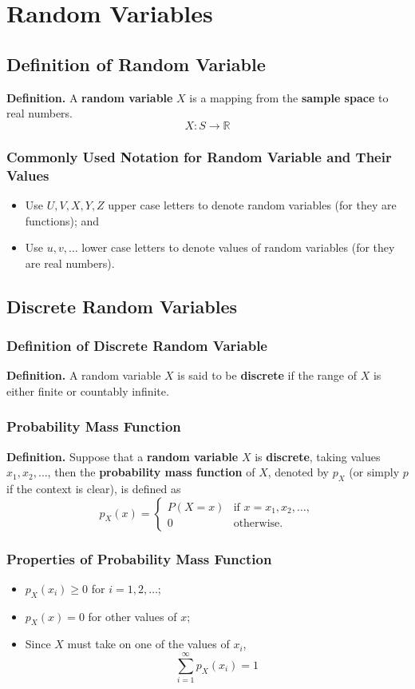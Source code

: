 \documentclass[../st2131_notes.tex]{subfiles}
\begin{document}
\chapter{Random Variables}
\section{Definition of Random Variable}
\textbf{Definition.} A \textbf{random variable} \(X\) is a mapping from the \textbf{sample space} to real numbers.
\[X:S\to\mathbb{R}\]

\subsection{Commonly Used Notation for Random Variable and Their Values}
\begin{itemize}
	\item Use \(U,V,X,Y,Z\) upper case letters to denote random variables (for they are functions); and
	\item Use \(u,v,\ldots\) lower case letters to denote values of random variables (for they are real numbers).
\end{itemize}

\section{Discrete Random Variables}
\subsection{Definition of Discrete Random Variable}
\textbf{Definition.} A random variable \(X\) is said to be \textbf{discrete} if the range of \(X\) is either finite or countably infinite.

\subsection{Probability Mass Function}
\textbf{Definition.} Suppose that a \textbf{random variable} \(X\) is \textbf{discrete}, taking values \(x_1,x_2,\ldots\), then the \textbf{probability mass function} of \(X\), denoted by \(p_X\) (or simply \(p\) if the context is clear), is defined as
\[p_X(x)=\begin{cases}
	P(X=x) & \text{if } x=x_1,x_2,\ldots, \\
	0 & \text{otherwise}.
\end{cases}\]

\subsection{Properties of Probability Mass Function}
\begin{itemize}
	\item\(p_X(x_i)\geq0\) for \(i=1,2,\ldots\);
	\item\(p_X(x)=0\) for other values of \(x\);
	\item Since \(X\) must take on one of the values of \(x_i\),
	\[\sum_{i=1}^\infty p_X(x_i)=1\]
\end{itemize}
\end{document}
